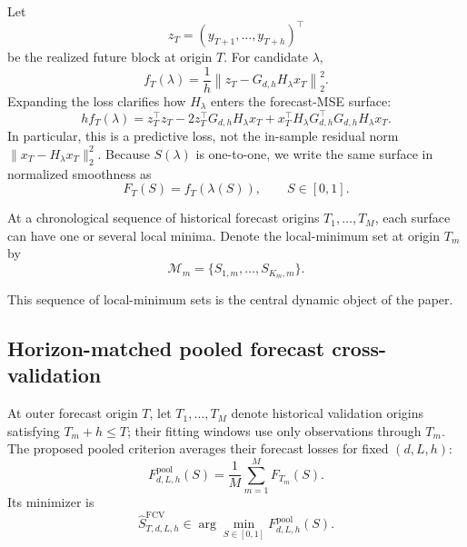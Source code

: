 Let
\begin{equation}
\label{eq:future_observation_block}
z_T=(y_{T+1},\ldots,y_{T+h})^\top
\end{equation}
be the realized future block at origin $T$. For candidate $\lambda$,
\begin{equation}
\label{eq:origin_loss}
f_T(\lambda)
=
\frac{1}{h}
\left\|
z_T-G_{d,h}H_\lambda x_T
\right\|_2^2.
\end{equation}
Expanding the loss clarifies how $H_\lambda$ enters the forecast-MSE surface:
\begin{equation}
\label{eq:origin_loss_quadratic}
h f_T(\lambda)
= z_T^\top z_T
- 2z_T^\top G_{d,h}H_\lambda x_T
+ x_T^\top H_\lambda G_{d,h}^\top G_{d,h}H_\lambda x_T.
\end{equation}
In particular, this is a predictive loss, not the in-sample residual
norm $\|x_T-H_\lambda x_T\|_2^2$. Because $S(\lambda)$ is
one-to-one, we write the same surface in normalized smoothness as
\begin{equation}
\label{eq:origin_loss_smoothness}
F_T(S)=f_T(\lambda(S)),
\qquad
S\in[0,1].
\end{equation}

At a chronological sequence of historical forecast origins $T_1,\ldots,T_M$, each surface can have one or several local minima. Denote the local-minimum set at origin $T_m$ by
\begin{equation}
\label{eq:local_minimum_set}
\mathcal M_m
=
\{S_{1,m},\ldots,S_{K_m,m}\}.
\end{equation}

This sequence of local-minimum sets is the central dynamic object of the paper.

\subsection{Horizon-matched pooled forecast cross-validation}

At outer forecast origin $T$, let $T_1,\ldots,T_M$ denote historical validation origins satisfying $T_m+h\le T$; their fitting windows use only observations through $T_m$. The proposed pooled criterion averages their forecast losses for fixed $(d,L,h)$:
\begin{equation}
\label{eq:F_S}
F^{\mathrm{pool}}_{d,L,h}(S)
=
\frac{1}{M}
\sum_{m=1}^{M}F_{T_m}(S).
\end{equation}
Its minimizer is
\begin{equation}
\label{eq:Sstar}
\widehat S^{\mathrm{FCV}}_{T,d,L,h}
\in
\arg\min_{S\in[0,1]}
F^{\mathrm{pool}}_{d,L,h}(S).
\end{equation}

